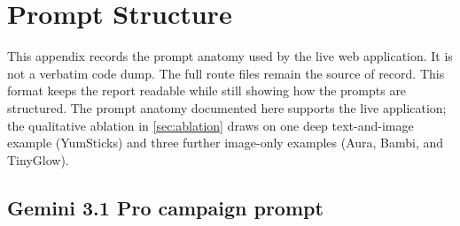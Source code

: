 \documentclass[12pt,a4paper]{report}
\begin{document}
\appendix

\chapter{Prompt Structure}
\label{app:prompts}

This appendix records the prompt anatomy used by the live web application. It is not a verbatim code dump. The full route files remain the source of record. This format keeps the report readable while still showing how the prompts are structured. The prompt anatomy documented here supports the live application; the qualitative ablation in \cref{sec:ablation} draws on one deep text-and-image example (YumSticks) and three further image-only examples (Aura, Bambi, and TinyGlow).

\section{Gemini 3.1 Pro campaign prompt}
\label{sec:campprompt}
\end{document}
